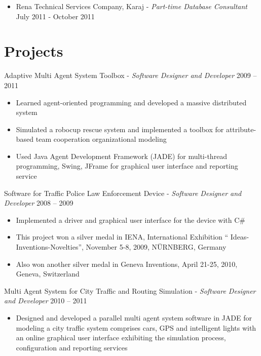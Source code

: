 \documentclass[letter]{res}
\begin{document}
\begin{resume}
\begin{itemize}
  \item Rena Technical Services Company, Karaj \newline
- {\sl Part-time Database Consultant} \hfill July 2011 - October 2011\\
	\vspace{-4mm}

\end{itemize}

\section{Projects}
Adaptive Multi Agent System Toolbox \newline
  - {\sl Software Designer and Developer} \hfill 2009 – 2011\\
  \vspace{-4mm}
  \iflong
    \begin{itemize}
    \item Learned agent-oriented programming and developed a massive distributed system
    \item Simulated a robocup rescue system and implemented a toolbox for 				attribute-based team cooperation organizational modeling
    \item Used Java Agent Development Framework (JADE) for multi-thread programming, 		Swing, JFrame for graphical user interface and reporting service
    \end{itemize}
  \fi

Software for Traffic Police Law Enforcement Device \newline
   - {\sl Software Designer and Developer} \hfill 2008 – 2009\\
   \vspace{-4mm}
   \iflong
      \begin{itemize}
        \item Implemented a driver and graphical user interface for the device with C\#
        \item This project won a silver medal in IENA, International Exhibition `` Ideas-Inventions-Novelties'', November 5-8, 2009, N\"{U}RNBERG, Germany
        \item Also won another silver medal in Geneva Inventions, April 21-25, 2010, Geneva, 		Switzerland
      \end{itemize}
   \fi
   
Multi Agent System for City Traffic and Routing Simulation \newline
   - {\sl Software Designer and Developer} \hfill 2010 – 2011\\
   \vspace{-4mm}
   \iflong
     \begin{itemize}
        \item Designed and developed a parallel multi agent system software in JADE for modeling a city traffic system comprises cars, GPS and intelligent lights with an online graphical user interface exhibiting the simulation process, configuration and reporting services
      \end{itemize}
	\fi
    

\end{resume}
\end{document}
